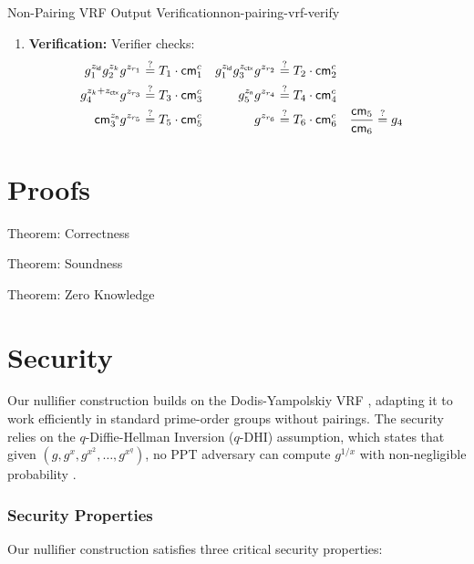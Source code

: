 \begin{protocol}{Non-Pairing VRF Output Verification}{non-pairing-vrf-verify}
\begin{enumerate}
    \item \textbf{Verification:} Verifier checks:
    \begin{align*}
        g_1^{z_{\mathsf{id}}} g_2^{z_k} g^{z_{r_1}} &\stackrel{?}{=} T_1 \cdot \mathsf{cm}_1^c 
        & 
        g_1^{z_{\mathsf{id}}} g_3^{z_{\mathsf{ctx}}} g^{z_{r_2}} &\stackrel{?}{=} T_2 \cdot \mathsf{cm}_2^c \\
        g_4^{z_k + z_{\mathsf{ctx}}} g^{z_{r_3}} &\stackrel{?}{=} T_3 \cdot \mathsf{cm}_3^c
        &
        g_5^{z_{\textsf{n}}} g^{z_{r_4}} &\stackrel{?}{=} T_4 \cdot \mathsf{cm}_4^c \\
        \mathsf{cm}_3^{z_{\textsf{n}}} g^{z_{r_5}} &\stackrel{?}{=} T_5 \cdot \mathsf{cm}_5^c
        &
        g^{z_{r_6}} &\stackrel{?}{=} T_6 \cdot \mathsf{cm}_6^c
        &
        \frac{\mathsf{cm}_5}{\mathsf{cm}_6} &\stackrel{?}{=} g_4
    \end{align*}
\end{enumerate}
\end{protocol}

\section{Proofs}

Theorem: Correctness

Theorem: Soundness

Theorem: Zero Knowledge

\section{Security}

Our nullifier construction builds on the Dodis-Yampolskiy VRF \cite{hutchison_verifiable_2005}, adapting it to work efficiently in standard prime-order groups without pairings. The security relies on the $q$-Diffie-Hellman Inversion ($q$-DHI) assumption, which states that given $(g, g^x, g^{x^2}, \ldots, g^{x^q})$, no PPT adversary can compute $g^{1/x}$ with non-negligible probability \cite{mitsunari_new_2002}.

\subsubsection{Security Properties}

Our nullifier construction satisfies three critical security properties:

